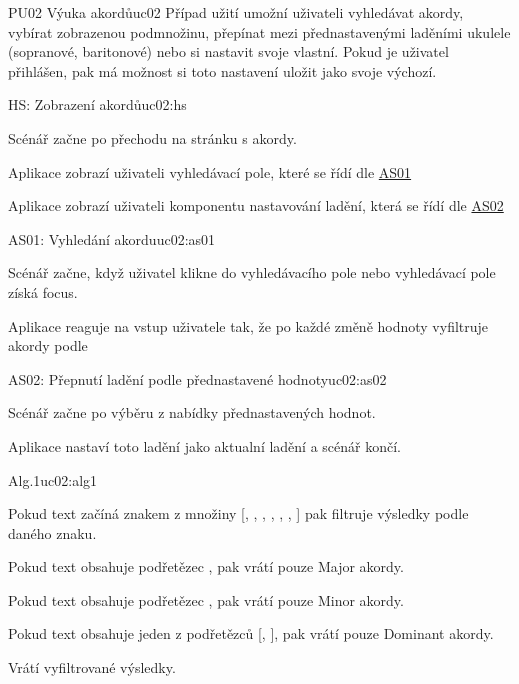 \begin{usecase}{PU02 Výuka akordů}{uc02}
    Případ užití umožní uživateli vyhledávat akordy, vybírat zobrazenou podmnožinu, přepínat mezi přednastavenými laděními ukulele (sopranové, baritonové) nebo si nastavit svoje vlastní. Pokud je uživatel přihlášen, pak má možnost si toto nastavení uložit jako svoje výchozí.

    \begin{scenario}{HS: Zobrazení akordů}{uc02:hs}
        \item Scénář začne po přechodu na stránku s akordy.
        \item Aplikace zobrazí uživateli vyhledávací pole, které se řídí dle \hyperref[uc02:as01]{AS01}
        \item Aplikace zobrazí uživateli komponentu nastavování ladění, která se řídí dle \hyperref[uc02:as02]{AS02}
    \end{scenario}

    \begin{scenario}{AS01: Vyhledání akordu}{uc02:as01}
        \item Scénář začne, když uživatel klikne do vyhledávacího pole nebo vyhledávací pole získá focus.
        \item Aplikace reaguje na vstup uživatele tak, že po každé změně hodnoty vyfiltruje akordy podle 
    \end{scenario}

    \begin{scenario}{AS02: Přepnutí ladění podle přednastavené hodnoty}{uc02:as02}
        \item Scénář začne po výběru z nabídky přednastavených hodnot.
        \item Aplikace nastaví toto ladění jako aktualní ladění a scénář končí.        
    \end{scenario}

    \begin{scenario}{Alg.1}{uc02:alg1}
        \item Pokud text začíná znakem z množiny [, , , , , , ] pak filtruje výsledky podle daného znaku.
        \item Pokud text obsahuje podřetězec , pak vrátí pouze Major akordy.
        \item Pokud text obsahuje podřetězec , pak vrátí pouze Minor akordy.
        \item Pokud text obsahuje jeden z podřetězců [, ], pak vrátí pouze Dominant akordy.
        \item Vrátí vyfiltrované výsledky.        
    \end{scenario}
\end{usecase}